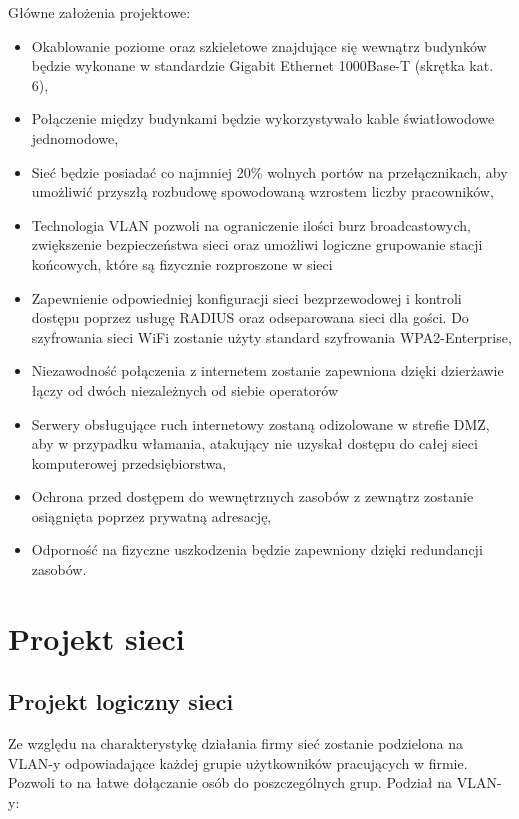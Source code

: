 \documentclass[12pt,a4paper,titlepage]{article}
\begin{document}
Główne założenia projektowe:
\begin{itemize}
    \item Okablowanie poziome oraz szkieletowe znajdujące się wewnątrz budynków będzie wykonane w standardzie Gigabit Ethernet 1000Base-T (skrętka kat. 6),
    \item Połączenie między budynkami będzie wykorzystywało kable światłowodowe jednomodowe,
    \item Sieć będzie posiadać co najmniej 20\% wolnych portów na przełącznikach, aby umożliwić przyszłą rozbudowę spowodowaną wzrostem liczby pracowników,
    \item Technologia VLAN pozwoli na ograniczenie ilości burz broadcastowych, zwiększenie bezpieczeństwa sieci oraz umożliwi logiczne grupowanie stacji końcowych, które są fizycznie rozproszone w sieci
    \item Zapewnienie odpowiedniej konfiguracji sieci bezprzewodowej i kontroli dostępu poprzez usługę RADIUS oraz odseparowana sieci dla gości. Do szyfrowania sieci WiFi zostanie użyty standard szyfrowania WPA2-Enterprise,
    \item Niezawodność połączenia z internetem zostanie zapewniona dzięki dzierżawie łączy od dwóch niezależnych od siebie operatorów
    \item Serwery obsługujące ruch internetowy zostaną odizolowane w strefie DMZ, aby  w przypadku  włamania,  atakujący  nie  uzyskał  dostępu  do  całej  sieci komputerowej przedsiębiorstwa,
    \item Ochrona  przed  dostępem do wewnętrznych zasobów z zewnątrz zostanie osiągnięta poprzez prywatną adresację,
    \item Odporność na fizyczne uszkodzenia będzie zapewniony dzięki redundancji zasobów.
\end{itemize}

\section{Projekt sieci}
\subsection{Projekt logiczny sieci}

Ze względu na charakterystykę działania firmy sieć zostanie podzielona na VLAN-y odpowiadające
każdej grupie użytkowników pracujących w firmie. Pozwoli to na łatwe dołączanie osób do poszczególnych
grup.
Podział na VLAN-y:
\end{document}
